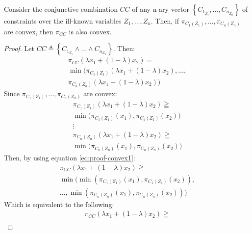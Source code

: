 \begin{theorem}
\label{th:convex-combination-ill-known-constraints}
Consider the conjunctive combination $CC$ of any n-ary vector $\left \lbrace C_{1_{Z_1}}, \ldots, C_{n_{Z_n}} \right \rbrace$ of constraints over the ill-known variables $Z_1, \ldots, Z_n$. Then, if $\pi_{C_1(Z_1)}, \ldots, \pi_{C_n(Z_n)}$ are convex, then  $\pi_{CC}$ is also convex.
\end{theorem}

\begin{proof}
Let $CC \triangleq \left \lbrace C_{1_{Z_1}} \wedge \ldots \wedge C_{n_{Z_n}}  \right \rbrace$. Then:
\begin{align}
\label{eq:proof-convex1}
\pi_{CC} \left( \lambda x_1 + \left( 1 - \lambda \right)x_2 \right) = \\
\nonumber
\min  \big( \pi_{C_1(Z_1)}\left( \lambda x_1 + \left( 1 - \lambda \right)x_2 \right), \ldots,\\
\nonumber
   \pi_{C_n(Z_n)}\left( \lambda x_1 + \left( 1 - \lambda \right)x_2 \right)  \big)
\end{align}
Since $\pi_{C_1(Z_1)}, \ldots, \pi_{C_n(Z_n)}$ are convex:
\begin{align}
\label{eq:proof-convex2}
\pi_{C_1(Z_1)} \left(\lambda x_1 + \left( 1 - \lambda \right)x_2  \right) \geqq \\
\nonumber
\min \big(\pi_{C_1(Z_1)} \left( x_1 \right),\pi_{C_1(Z_1)} \left( x_2 \right)  \big)\\
\nonumber
\vdots \\
\nonumber
\pi_{C_n(Z_n)} \left(\lambda x_1 + \left( 1 - \lambda \right)x_2  \right) \geqq \\
\nonumber
\min \big(\pi_{C_n(Z_n)} \left( x_1 \right),\pi_{C_n(Z_n)} \left( x_2 \right) \big) 
\end{align}
Then, by using equation \eqref{eq:proof-convex1}:
\begin{align}
\label{eq:proof-convex3}
\pi_{CC} \left( \lambda x_1 + \left( 1 - \lambda \right)x_2 \right) \geqq  \\
\nonumber
\min \big( \min \left(\pi_{C_1(Z_1)} \left( x_1 \right),\pi_{C_1(Z_1)} \left( x_2 \right) \right),\\
\nonumber
\ldots, \min \left(\pi_{C_n(Z_n)} \left( x_1 \right),\pi_{C_n(Z_n)} \left( x_2 \right) \right) \big)
\end{align}
Which is equivalent to the following:
\begin{align}
\label{eq:proof-convex4}
\pi_{CC} \left( \lambda x_1 + \left( 1 - \lambda \right)x_2 \right) \geqq  \\

\end{align}
\end{proof}
